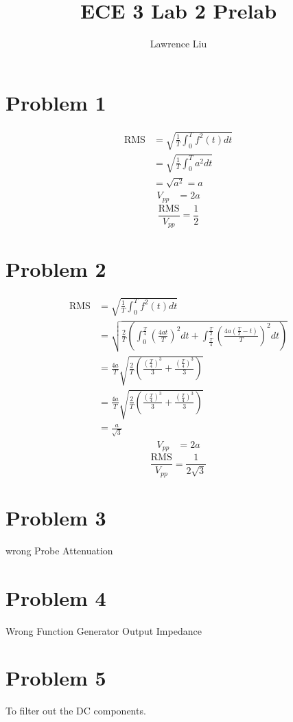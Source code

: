 \documentclass[12pt]{article}
\title{ECE 3 Lab 2 Prelab}
\author{Lawrence Liu}
\begin{document}
\maketitle
\section*{Problem 1}
\begin{align*}
\text{RMS}&=\sqrt{\frac{1}{T}\int_{0}^{T}f^2(t)dt}\\
&=\sqrt{\frac{1}{T}\int_{0}^{T}a^2dt}\\
&=\sqrt{a^2}=a
\end{align*}
\begin{align*}
V_{pp}&=2a
\end{align*}
$$\frac{\text{RMS}}{V_{pp}}=\boxed{\frac{1}{2}}$$
\section*{Problem 2}
\begin{align*}
\text{RMS}&=\sqrt{\frac{1}{T}\int_{0}^{T}f^2(t)dt}\\
&=\sqrt{\frac{2}{T}\left(\int_{0}^{\frac{T}{4}}\left(\frac{4at}{T}\right)^2dt+\int_{\frac{T}{4}}^{\frac{T}{2}}\left(\frac{4a(\frac{T}{2}-t)}{T}\right)^2dt\right)}\\
&=\frac{4a}{T}\sqrt{\frac{2}{T}\left(\frac{\left(\frac{T}{4}\right)^3}{3}+\frac{\left(\frac{T}{4}\right)^3}{3}\right)}\\
&=\frac{4a}{T}\sqrt{\frac{2}{T}\left(\frac{\left(\frac{T}{4}\right)^3}{3}+\frac{\left(\frac{T}{4}\right)^3}{3}\right)}\\
&=\frac{a}{\sqrt{3}}
\end{align*}
\begin{align*}
V_{pp}&=2a
\end{align*}
$$\frac{\text{RMS}}{V_{pp}}=\boxed{\frac{1}{2\sqrt{3}}}$$
\section*{Problem 3}
wrong Probe Attenuation 
\section*{Problem 4}
Wrong Function Generator Output Impedance
\section*{Problem 5}
To filter out the DC components.
\end{document}
